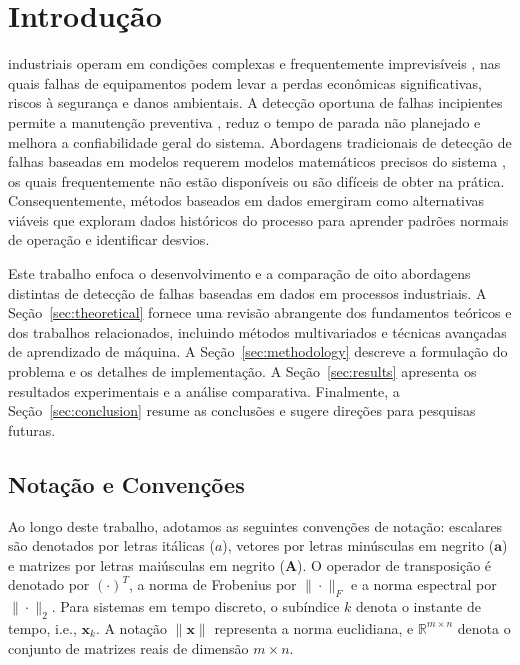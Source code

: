 \documentclass[journal]{IEEEtran}
\begin{document}
\IEEEpeerreviewmaketitle

\section{Introdução}
\label{sec:introduction}
 industriais operam em condições complexas e frequentemente imprevisíveis \cite{isermann2011}, nas quais falhas de equipamentos podem levar a perdas econômicas significativas, riscos à segurança e danos ambientais. A detecção oportuna de falhas incipientes permite a manutenção preventiva \cite{venkatasubramanian2003}, reduz o tempo de parada não planejado e melhora a confiabilidade geral do sistema. Abordagens tradicionais de detecção de falhas baseadas em modelos requerem modelos matemáticos precisos do sistema \cite{gertler1998}, os quais frequentemente não estão disponíveis ou são difíceis de obter na prática. Consequentemente, métodos baseados em dados emergiram como alternativas viáveis \cite{venkatasubramanian2003} que exploram dados históricos do processo para aprender padrões normais de operação e identificar desvios.

Este trabalho enfoca o desenvolvimento e a comparação de oito abordagens distintas de detecção de falhas baseadas em dados em processos industriais. A Seção~\ref{sec:theoretical} fornece uma revisão abrangente dos fundamentos teóricos e dos trabalhos relacionados, incluindo métodos multivariados \cite{yin2012} e técnicas avançadas de aprendizado de máquina. A Seção~\ref{sec:methodology} descreve a formulação do problema e os detalhes de implementação. A Seção~\ref{sec:results} apresenta os resultados experimentais e a análise comparativa. Finalmente, a Seção~\ref{sec:conclusion} resume as conclusões e sugere direções para pesquisas futuras.

\subsection{Notação e Convenções}
\label{subsec:notation}

Ao longo deste trabalho, adotamos as seguintes convenções de notação: escalares são denotados por letras itálicas ($a$), vetores por letras minúsculas em negrito ($\mathbf{a}$) e matrizes por letras maiúsculas em negrito ($\mathbf{A}$). O operador de transposição é denotado por $(\cdot)^T$, a norma de Frobenius por $\|\cdot\|_F$ e a norma espectral por $\|\cdot\|_2$. Para sistemas em tempo discreto, o subíndice $k$ denota o instante de tempo, i.e., $\mathbf{x}_k$. A notação $\|\mathbf{x}\|$ representa a norma euclidiana, e $\mathbb{R}^{m \times n}$ denota o conjunto de matrizes reais de dimensão $m \times n$.
\end{document}
